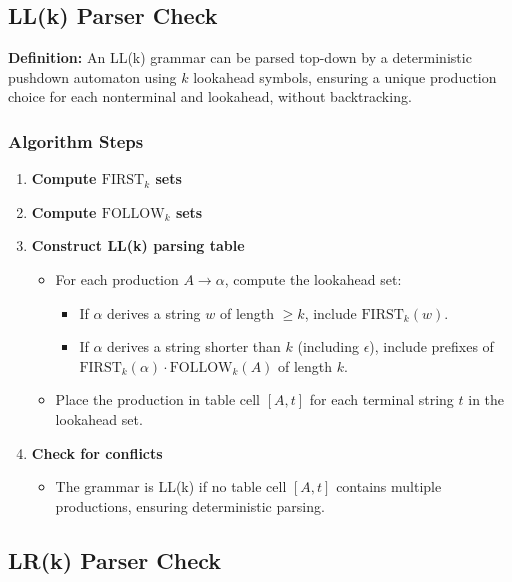 \subsection{LL(k) Parser Check}

\textbf{Definition:} An LL(k) grammar can be parsed top-down by a deterministic pushdown automaton using $k$ lookahead symbols, ensuring a unique production choice for each nonterminal and lookahead, without backtracking.

\subsubsection{Algorithm Steps}

\begin{enumerate}
    \item \textbf{Compute $\text{FIRST}_k$ sets}

    \item \textbf{Compute $\text{FOLLOW}_k$ sets}

    \item \textbf{Construct LL(k) parsing table}
    \begin{itemize}
        \item For each production $A \to \alpha$, compute the lookahead set:
        \begin{itemize}
            \item If $\alpha$ derives a string $w$ of length $\geq k$, include $\text{FIRST}_k(w)$.
            \item If $\alpha$ derives a string shorter than $k$ (including $\epsilon$), include prefixes of $\text{FIRST}_k(\alpha) \cdot \text{FOLLOW}_k(A)$ of length $k$.
        \end{itemize}
        \item Place the production in table cell $[A, t]$ for each terminal string $t$ in the lookahead set.
    \end{itemize}

    \item \textbf{Check for conflicts}
    \begin{itemize}
        \item The grammar is LL(k) if no table cell $[A, t]$ contains multiple productions, ensuring deterministic parsing.
    \end{itemize}
\end{enumerate}


\subsection{LR(k) Parser Check}

